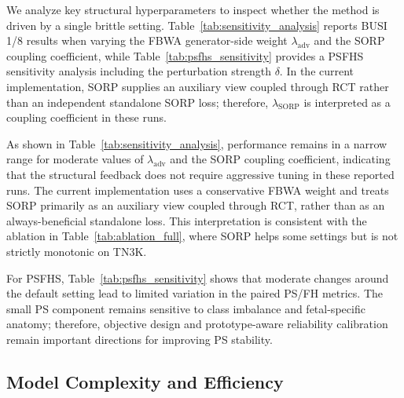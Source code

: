 \documentclass[a4paper,fleqn]{cas-dc}
\begin{document}
We analyze key structural hyperparameters to inspect whether the method is driven by a single brittle setting. Table~\ref{tab:sensitivity_analysis} reports BUSI 1/8 results when varying the FBWA generator-side weight $\lambda_{\text{adv}}$ and the SORP coupling coefficient, while Table~\ref{tab:psfhs_sensitivity} provides a PSFHS sensitivity analysis including the perturbation strength $\delta$. In the current implementation, SORP supplies an auxiliary view coupled through RCT rather than an independent standalone SORP loss; therefore, $\lambda_{\text{SORP}}$ is interpreted as a coupling coefficient in these runs.

As shown in Table~\ref{tab:sensitivity_analysis}, performance remains in a narrow range for moderate values of $\lambda_{\text{adv}}$ and the SORP coupling coefficient, indicating that the structural feedback does not require aggressive tuning in these reported runs. The current implementation uses a conservative FBWA weight and treats SORP primarily as an auxiliary view coupled through RCT, rather than as an always-beneficial standalone loss. This interpretation is consistent with the ablation in Table~\ref{tab:ablation_full}, where SORP helps some settings but is not strictly monotonic on TN3K.

For PSFHS, Table~\ref{tab:psfhs_sensitivity} shows that moderate changes around the default setting lead to limited variation in the paired PS/FH metrics. The small PS component remains sensitive to class imbalance and fetal-specific anatomy; therefore, objective design and prototype-aware reliability calibration remain important directions for improving PS stability.


\subsection{Model Complexity and Efficiency}
\end{document}
